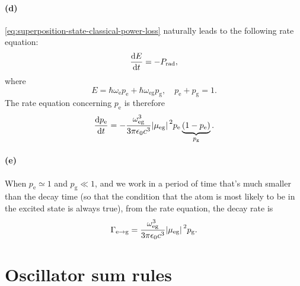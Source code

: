 \documentclass[hyperref, a4paper]{article}
\newcommand*{\omegae}{\omega_{\text{e}}}
\newcommand*{\omegaeg}{\omega_{\text{eg}}}
\newcommand*{\mueg}{\mu_{\text{eg}}}
\newcommand*{\pope}{p_{\text{e}}}
\newcommand*{\popg}{p_{\text{g}}}
\begin{document}
\paragraph{(d)} \eqref{eq:superposition-state-classical-power-loss} 
naturally leads to the following rate equation:
\begin{equation}
    \dv{E}{t} = - P_{\text{rad}}, 
\end{equation}
where 
\begin{equation}
    E = \hbar \omegae \pope + \hbar \omegaeg \popg, \quad 
    \pope + \popg = 1.
\end{equation}
The rate equation concerning $\pope$ is therefore 
\begin{equation}
    \dv{\pope}{t} = - \frac{\omegaeg^3}{3 \pi \epsilon_0 c^3} \abs*{\mueg}^2 \pope \underbrace{
        (1 - \pope)
    }_{\popg}.
\end{equation}

\paragraph{(e)} When $\pope \simeq 1$ and $\popg \ll 1$, 
and we work in a period of time that's much smaller than the decay time
(so that the condition that the atom is most likely 
to be in the excited state is always true),
from the rate equation, the decay rate is 
\begin{equation}
    \Gamma_{\text{e} \to \text{g}}
    = \frac{\omegaeg^3}{3 \pi \epsilon_0 c^3} \abs*{\mueg}^2 \popg.
\end{equation}

\section{Oscillator sum rules}
\end{document}
